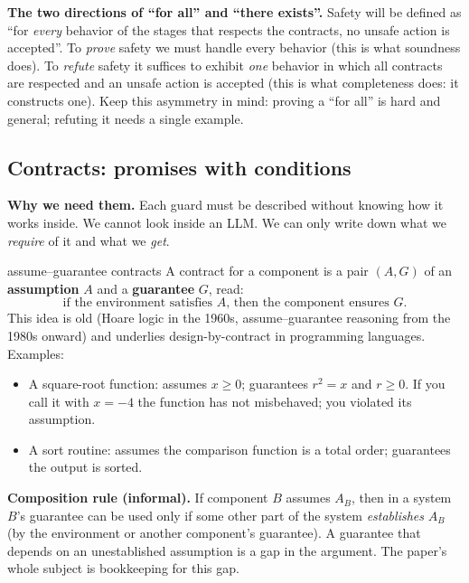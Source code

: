 \textbf{The two directions of ``for all'' and ``there exists''.} Safety will be defined as ``for \emph{every} behavior of the stages that respects the contracts, no unsafe action is accepted''. To \emph{prove} safety we must handle every behavior (this is what soundness does). To \emph{refute} safety it suffices to exhibit \emph{one} behavior in which all contracts are respected and an unsafe action is accepted (this is what completeness does: it constructs one). Keep this asymmetry in mind: proving a ``for all'' is hard and general; refuting it needs a single example.

\subsection{Contracts: promises with conditions}

\textbf{Why we need them.} Each guard must be described without knowing how it works inside. We cannot look inside an LLM. We can only write down what we \emph{require} of it and what we \emph{get}.

\begin{toolbox}{assume--guarantee contracts}
A contract for a component is a pair $(A,G)$ of an \textbf{assumption} $A$ and a \textbf{guarantee} $G$, read:
\[
\text{if the environment satisfies } A \text{, then the component ensures } G.
\]
This idea is old (Hoare logic in the 1960s, assume--guarantee reasoning from the 1980s onward) and underlies design-by-contract in programming languages. Examples:

\begin{itemize}
\item A square-root function: assumes $x\ge 0$; guarantees $r^2=x$ and $r\ge0$. If you call it with $x=-4$ the function has not misbehaved; you violated its assumption.
\item A sort routine: assumes the comparison function is a total order; guarantees the output is sorted.
\end{itemize}
\textbf{Composition rule (informal).} If component $B$ assumes $A_B$, then in a system $B$'s guarantee can be used only if some other part of the system \emph{establishes} $A_B$ (by the environment or another component's guarantee). A guarantee that depends on an unestablished assumption is a gap in the argument. The paper's whole subject is bookkeeping for this gap.
\end{toolbox}

